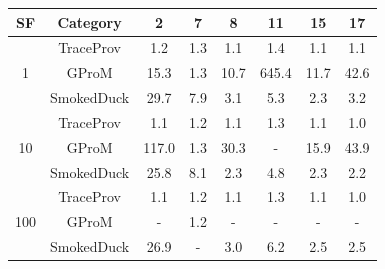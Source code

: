 \begin{tabular}{|c|c|c|c|c|c|c|c|}
\hline
SF & Category & 2 & 7 & 8 & 11 & 15 & 17 \\  
 \hline 
 \multirow{3}{*}{1} & TraceProv & 1.2 & 1.3 & 1.1 & 1.4 & 1.1 & 1.1 \\  
 \cline{2-8} 
  & GProM & 15.3 & 1.3 & 10.7 & 645.4 & 11.7 & 42.6 \\  
 \cline{2-8} 
  & SmokedDuck & 29.7 & 7.9 & 3.1 & 5.3 & 2.3 & 3.2 \\  
 \hline 
 \multirow{3}{*}{10} & TraceProv & 1.1 & 1.2 & 1.1 & 1.3 & 1.1 & 1.0 \\  
 \cline{2-8} 
  & GProM & 117.0 & 1.3 & 30.3 & - & 15.9 & 43.9 \\  
 \cline{2-8} 
  & SmokedDuck & 25.8 & 8.1 & 2.3 & 4.8 & 2.3 & 2.2 \\  
 \hline 
 \multirow{3}{*}{100} & TraceProv & 1.1 & 1.2 & 1.1 & 1.3 & 1.1 & 1.0 \\  
 \cline{2-8} 
  & GProM & - & 1.2 & - & - & - & - \\  
 \cline{2-8} 
  & SmokedDuck & 26.9 & - & 3.0 & 6.2 & 2.5 & 2.5 \\ 
\hline
\end{tabular}